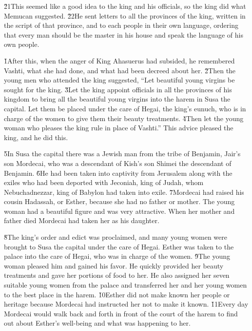 \v{21}This seemed like a good idea to the king and his officials, so the king did what Memucan suggested. \v{22}He sent letters to all the provinces of the king, written in the script of that province, and to each people in their own language, ordering that every man should be the master in his house and speak the language of his own people.

\v{1}After this, when the anger of King Ahasuerus had subsided, he remembered Vashti, what she had done, and what had been decreed about her. \v{2}Then the young men who attended the king suggested, ``Let beautiful young virgins be sought for the king. \v{3}Let the king appoint officials in all the provinces of his kingdom to bring all the beautiful young virgins into the harem in Susa the capital. Let them be placed under the care of Hegai, the king's eunuch, who is in charge of the women to give them their beauty treatments. \v{4}Then let the young woman who pleases the king rule in place of Vashti.'' This advice pleased the king, and he did this.

\v{5}In Susa the capital there was a Jewish man from the tribe of Benjamin, Jair's son Mordecai, who was a descendant of Kish's son Shimei the descendant of Benjamin. \v{6}He had been taken into captivity from Jerusalem along with the exiles who had been deported with Jeconiah, king of Judah, whom Nebuchadnezzar, king of Babylon had taken into exile. \v{7}Mordecai had raised his cousin Hadassah, or Esther, because she had no father or mother. The young woman had a beautiful figure and was very attractive. When her mother and father died Mordecai had taken her as his daughter.

\v{8}The king's order and edict was proclaimed, and many young women were brought to Susa the capital under the care of Hegai. Esther was taken to the palace into the care of Hegai, who was in charge of the women. \v{9}The young woman pleased him and gained his favor. He quickly provided her beauty treatments and gave her portions of food to her. He also assigned her seven suitable young women from the palace and transferred her and her young women to the best place in the harem. \v{10}Esther did not make known her people or heritage because Mordecai had instructed her not to make it known. \v{11}Every day Mordecai would walk back and forth in front of the court of the harem to find out about Esther's well-being and what was happening to her.

